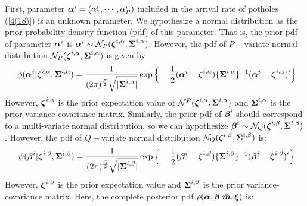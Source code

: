 \documentclass[Journal]{ascelike}
\begin{document}
First, parameter $\mbox{\boldmath$\alpha$}^i=(\alpha_1^i,\cdots,\alpha_P^i)$ included in the arrival rate of potholes (\ref{4(18)}) is an unknown parameter. We hypothesize a normal distribution as the prior probability density function (pdf) of this parameter. That is, the prior pdf of parameter $\mbox{\boldmath$\alpha$}^i$ is $\mbox{\boldmath$\alpha$}^i \sim {\cal N}_P(\mbox{\boldmath$\zeta$}^{i,\alpha},\mbox{\boldmath$\Sigma$}^{i,\alpha})$. However, the pdf of $P-$variate normal distribution ${\cal N}_P(\mbox{\boldmath$\zeta$}^{i,\alpha},\mbox{\boldmath$\Sigma$}^{i,\alpha})$ is given by
%
\begin{eqnarray}
      && \hspace{-2mm}
      \phi(\mbox{\boldmath$\alpha$}^i|
      \mbox{\boldmath$\zeta$}^{i,\alpha},\mbox{\boldmath$\Sigma$}^{i,\alpha})
      = \frac{1}{(2\pi)^{\frac{P}{2}}\sqrt{|\mbox{\boldmath$\Sigma$}^{i,\alpha}|}}
            \exp\Big\{-\frac{1}{2}(\mbox{\boldmath$\alpha$}^i
      -\mbox{\boldmath$\zeta$}^{i,\alpha})
      \{\mbox{\boldmath$\Sigma$}^{i,\alpha}\}^{-1}
    (\mbox{\boldmath$\alpha$}^{i}-\mbox{\boldmath$\zeta$}^{i,\alpha})^\prime\Big\}
            \label{4Kseiki}
   \end{eqnarray}
%
However, $\mbox{\boldmath$\zeta$}^{i,\alpha}$ is the prior expectation value of ${\cal N}^P(\mbox{\boldmath$\zeta$}^{i,\alpha}, \mbox{\boldmath$\Sigma$}^{i,\alpha})$ and $\mbox{\boldmath$\Sigma$}^{i,\alpha}$ is the prior variance-covariance matrix. Similarly, the prior pdf of $\mbox{\boldmath$\beta$}^i$ should correspond to a multi-variate normal distribution, so we can hypothesize $\mbox{\boldmath$\beta$}^i \sim {\cal N}_Q(\mbox{\boldmath$\zeta$}^{i,\beta},\mbox{\boldmath$\Sigma$}^{i,\beta})$. However, the pdf of $Q-$variate normal distribution ${\cal N}_Q(\mbox{\boldmath$\zeta$}^{i,\beta},\mbox{\boldmath$\Sigma$}^{i,\beta})$ is:
   \begin{eqnarray}
      && \hspace{-2mm}
      \psi(\mbox{\boldmath$\beta$}^i|
      \mbox{\boldmath$\zeta$}^{i,\beta},\mbox{\boldmath$\Sigma$}^{i,\beta})
      = \frac{1}{(2\pi)^{\frac{Q}{2}}\sqrt{|\mbox{\boldmath$\Sigma$}^{i,\beta}|}}
       \exp\Big\{-\frac{1}{2}(\mbox{\boldmath$\beta$}^{i}
      -\mbox{\boldmath$\zeta$}^{i,\beta})
      \{\mbox{\boldmath$\Sigma$}^{i,\beta}\}^{-1}
      (\mbox{\boldmath$\beta$}^i-\mbox{\boldmath$\zeta$}^{i,\beta})^\prime\Big\}
            \label{4Keiki}
   \end{eqnarray}
However, $\mbox{\boldmath$\zeta$}^{i,\beta}$ is the prior expectation value and $\mbox{\boldmath$\Sigma$}^{i,\beta}$ is the prior variance-covariance matrix. Here, the complete posterior pdf $\rho(\mbox{\boldmath$\alpha$},\mbox{\boldmath$\beta$}|\tilde{\mbox{\boldmath$m$}},\bar{\mbox{\boldmath$\xi$}})$ is:
\end{document}
